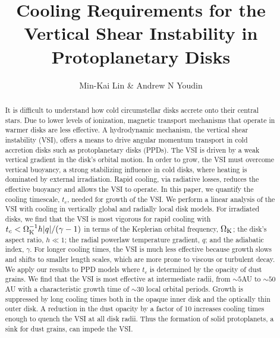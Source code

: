 \documentclass[iop, numberedappendix]{emulateapj}
\def \OmK {\Omega_{\rm K}}
\begin{document}
\title{Cooling Requirements for the Vertical Shear Instability 
  in Protoplanetary Disks}
\author{Min-Kai Lin\altaffilmark{$\dagger$} \& Andrew N Youdin}

\begin{abstract}
  It is difficult to understand how cold circumstellar disks accrete onto their central stars.  Due to 
  lower levels of ionization, magnetic transport mechanisms that
  operate in warmer disks are less effective.  
  A hydrodynamic mechanism, the vertical shear instability (VSI), offers a means to drive angular momentum 
  transport in cold accretion disks such as protoplanetary disks (PPDs).  
  The VSI is driven by a weak vertical gradient in the disk's orbital motion.
  In order to grow, the VSI must overcome vertical buoyancy, a strong
  stabilizing influence in cold disks, where  
  heating is dominated by external irradiation.  Rapid cooling, via
  radiative losses, reduces the effective buoyancy 
  and allows the VSI to operate.  In this paper, we quantify the
  cooling timescale, $t_c$, needed for growth of the VSI.
   We perform a linear analysis of the VSI with cooling in
  vertically global and radially local disk models. 
  For irradiated disks, we find that the VSI is most vigorous for
  rapid cooling with $t_c < \OmK^{-1}  h |q| / (\gamma -1)$ 
  in terms of the Keplerian orbital frequency, $\OmK$; the disk's
  aspect ratio, $ h \ll 1$; the radial  
  powerlaw temperature gradient, $q$; and the adiabatic index,
  $\gamma$.  For longer cooling times, the VSI  
  is much less effective because growth slows and shifts to smaller length scales, which are more prone to 
  viscous or turbulent decay.  We apply our results to PPD models 
  where $t_c$ is determined by the opacity of dust grains.  We
  find that the VSI is most effective at intermediate radii, from $\sim 5$AU to $\sim 50$AU with a
  characteristic growth time of $\sim 30$ local orbital periods.
  Growth is suppressed by long cooling times both in the opaque  
  inner disk and the optically thin outer disk.  A reduction in the
  dust opacity by a factor of 10 increases cooling times  
  enough to quench the VSI at all disk radii.  Thus the formation of
  solid protoplanets, a sink for dust grains, can impede the VSI. 
\end{abstract}
\end{document}

